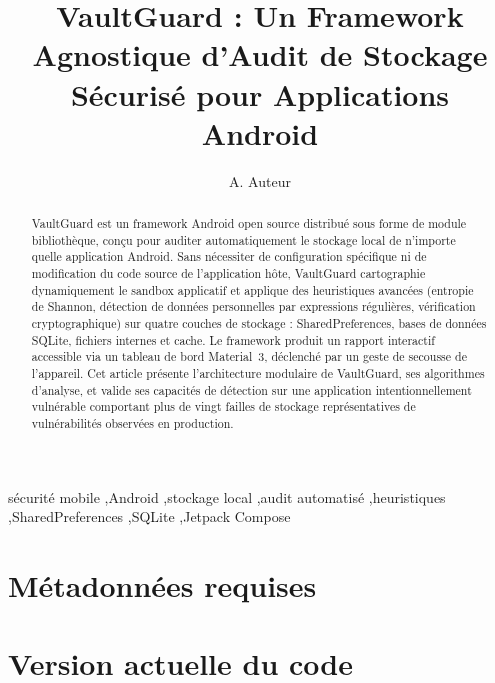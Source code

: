 \documentclass[preprint,12pt, a4paper]{elsarticle}
\begin{document}
\renewcommand{\labelenumii}{\arabic{enumi}.\arabic{enumii}}

\begin{frontmatter}

\title{VaultGuard : Un Framework Agnostique d'Audit de Stockage Sécurisé pour Applications Android}

\author{A. Auteur}

\address{Département d'Informatique, Université, Ville, Pays}

\begin{abstract}
VaultGuard est un framework Android open source distribué sous forme de module bibliothèque, conçu pour auditer automatiquement le stockage local de n'importe quelle application Android. Sans nécessiter de configuration spécifique ni de modification du code source de l'application hôte, VaultGuard cartographie dynamiquement le sandbox applicatif et applique des heuristiques avancées (entropie de Shannon, détection de données personnelles par expressions régulières, vérification cryptographique) sur quatre couches de stockage : SharedPreferences, bases de données SQLite, fichiers internes et cache. Le framework produit un rapport interactif accessible via un tableau de bord Material~3, déclenché par un geste de secousse de l'appareil. Cet article présente l'architecture modulaire de VaultGuard, ses algorithmes d'analyse, et valide ses capacités de détection sur une application intentionnellement vulnérable comportant plus de vingt failles de stockage représentatives de vulnérabilités observées en production.
\end{abstract}

\begin{keyword}
sécurité mobile \sep Android \sep stockage local \sep audit automatisé \sep heuristiques \sep SharedPreferences \sep SQLite \sep Jetpack Compose
\end{keyword}

\end{frontmatter}


\section*{Métadonnées requises}
\label{}

\section*{Version actuelle du code}
\label{}
\end{document}
